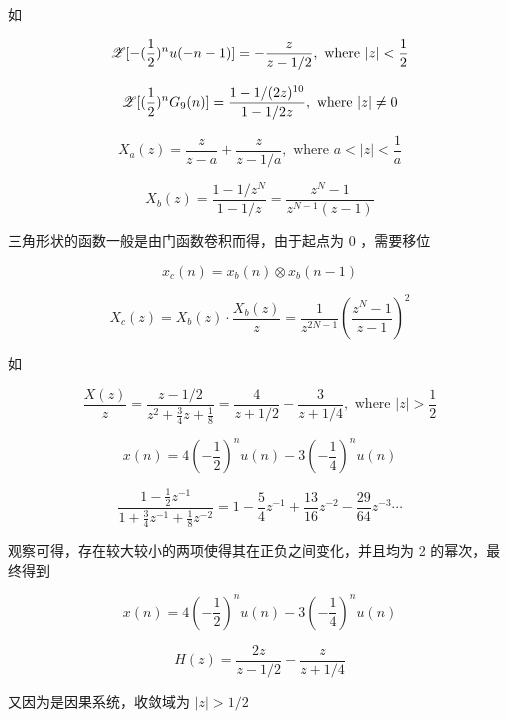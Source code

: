 \documentclass[lang=cn,11pt,a4paper,cite=authoryear]{elegantpaper}
\begin{document}
如




\[\mathscr{Z}[-(\frac{1}{2})^nu(-n-1)] = -\frac{z}{z-1/2}, \text{ where } |z| < \frac{1}{2}\]


\[\mathscr{Z}[(\frac{1}{2})^n G_{9}(n)] = \frac{1 - 1/(2z)^{10}}{1-1/2z}, \text{ where } |z| \neq 0\]



 \[X_a(z) = \frac{z}{z-a} + \frac{z}{z - 1/a}, \text{ where } a < |z| < \frac{1}{a}\]


\[X_b(z) = \frac{1-1/z^N}{1-1/z} = \frac{z^N - 1}{z^{N-1}(z-1)}\]


三角形状的函数一般是由门函数卷积而得，由于起点为 0 ，需要移位

\[x_c(n) = x_b(n) \otimes x_b(n-1)\]

\[X_c(z) = X_b(z) \cdot \frac{X_b(z)}{z} = \frac{1}{z^{2 N - 1}} (\frac{z^N - 1}{z-1})^2\]


如




\[\frac{X(z)}{z} = \frac{z - 1/2}{z^2 + \frac{3}{4} z + \frac{1}{8}} = \frac{4}{z+1/2}-\frac{3}{z+1/4}, \text{ where } |z| > \frac{1}{2}\]

\[x(n) = 4 (-\frac{1}{2})^n u(n) - 3 (-\frac{1}{4})^n u(n)\]


\[\frac{1-\frac{1}{2}z^{-1}}{1+\frac{3}{4}z^{-1}+\frac{1}{8}z^{-2}} = 1 - \frac{5}{4}z^{-1} + \frac{13}{16}z^{-2} - \frac{29}{64}z^{-3}\cdots\]

观察可得，存在较大较小的两项使得其在正负之间变化，并且均为 2 的幂次，最终得到

\[x(n) = 4 (-\frac{1}{2})^n u(n) - 3 (-\frac{1}{4})^n u(n)\]



\[H(z) = \frac{2 z}{z - 1/2} - \frac{z}{z+1/4}\]

又因为是因果系统，收敛域为 \(|z| > 1/2\)

\end{document}
